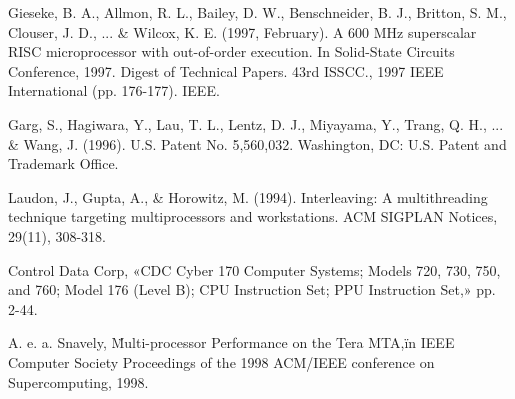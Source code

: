 \begin{thebibliography}{99}
 Gieseke, B. A., Allmon, R. L., Bailey, D. W., Benschneider, B. J., Britton, S. M., Clouser, J. D., ... \& Wilcox, K. E. (1997, February). A 600 MHz superscalar RISC microprocessor with out-of-order execution. In Solid-State Circuits Conference, 1997. Digest of Technical Papers. 43rd ISSCC., 1997 IEEE International (pp. 176-177). IEEE.

Garg, S., Hagiwara, Y., Lau, T. L., Lentz, D. J., Miyayama, Y., Trang, Q. H., ... \& Wang, J. (1996). U.S. Patent No. 5,560,032. Washington, DC: U.S. Patent and Trademark Office.

 Laudon, J., Gupta, A., \& Horowitz, M. (1994). Interleaving: A multithreading technique targeting multiprocessors and workstations. ACM SIGPLAN Notices, 29(11), 308-318.

Control Data Corp, «CDC Cyber 170 Computer Systems; Models 720, 730, 750, and 760; Model 176 (Level B); CPU Instruction Set; PPU Instruction Set,» pp. 2-44.

A. e. a. Snavely, \"Multi-processor Performance on the Tera MTA,\" in IEEE Computer Society Proceedings of the 1998 ACM/IEEE conference on Supercomputing, 1998. 


\end{thebibliography}